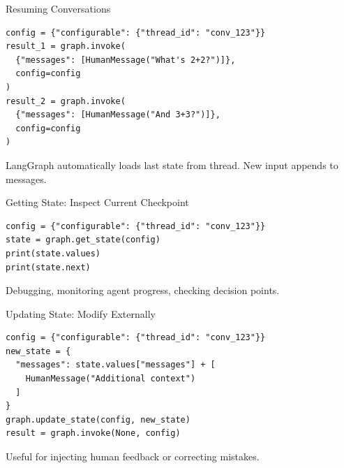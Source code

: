 \documentclass[aspectratio=169,11pt]{beamer}
\begin{document}
\begin{frame}[fragile]{Resuming Conversations}
  \begin{codebox}
    \begin{lstlisting}
config = {"configurable": {"thread_id": "conv_123"}}
result_1 = graph.invoke(
  {"messages": [HumanMessage("What's 2+2?")]},
  config=config
)
result_2 = graph.invoke(
  {"messages": [HumanMessage("And 3+3?")]},
  config=config
)
    \end{lstlisting}
  \end{codebox}
  \vspace{0.1cm}
  \begin{tipbox}
    LangGraph automatically loads last state from thread. New input appends to messages.
  \end{tipbox}
\end{frame}

\begin{frame}[fragile]{Getting State: Inspect Current Checkpoint}
  \begin{codebox}
    \begin{lstlisting}
config = {"configurable": {"thread_id": "conv_123"}}
state = graph.get_state(config)
print(state.values)
print(state.next)
    \end{lstlisting}
  \end{codebox}
  \vspace{0.1cm}
  \begin{tipbox}
    Debugging, monitoring agent progress, checking decision points.
  \end{tipbox}
\end{frame}

\begin{frame}[fragile]{Updating State: Modify Externally}
  \begin{codebox}
    \begin{lstlisting}
config = {"configurable": {"thread_id": "conv_123"}}
new_state = {
  "messages": state.values["messages"] + [
    HumanMessage("Additional context")
  ]
}
graph.update_state(config, new_state)
result = graph.invoke(None, config)
    \end{lstlisting}
  \end{codebox}
  \vspace{0.1cm}
  \begin{tipbox}
    Useful for injecting human feedback or correcting mistakes.
  \end{tipbox}
\end{frame}
\end{document}
